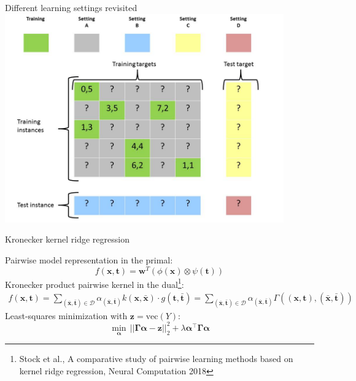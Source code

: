\documentclass[]{beamer}
\newcommand{\kkernelm}{\bm{\Gamma}}
\newcommand{\regparam}{\lambda}
\newcommand{\transpose}{^\intercal}
\newcommand{\bm}[1]{\mathbf{#1}}
\renewcommand{\vec}[1]{\boldsymbol{#1}}
\begin{document}
\begin{frame}{Different learning settings revisited}
   \center
	\vspace{0.4cm}
   \includegraphics[width=0.9\textwidth]{Figures/pictures/Slide16} %
\end{frame}

\begin{frame}{Kronecker kernel ridge regression}

\vspace{0.5cm}
Pairwise model representation in the primal: 
\begin{equation*}
\label{eq:pairwise}
f(\vec{x},\vec{t}) = \vec{w}^T \left(\phi(\vec{x}) \otimes \psi(\vec{t}) \right) 
\end{equation*}
Kronecker product pairwise kernel in the dual\footnote{Stock et al., A comparative study of pairwise learning methods based on kernel ridge regression, Neural Computation 2018}:
\begin{eqnarray*} 
f(\vec{x},\vec{t})= \sum_{(\bar{\vec{x}},\bar{\vec{t}}) \in \mathcal{D}} \alpha_{(\bar{\vec{x}},\bar{\vec{t}})}  k(\vec{x},\bar{\vec{x}}) \cdot g(\vec{t},\bar{\vec{t}})  = \sum_{(\bar{\vec{x}},\bar{\vec{t}}) \in \mathcal{D}} \alpha_{(\bar{\vec{x}},\bar{\vec{t}})} \Gamma((\vec{x},\vec{t}),(\bar{\vec{x}},\bar{\vec{t}})) 
\end{eqnarray*}
Least-squares minimization with 
$\bm{z} = \textrm{vec}{(Y)}$: 
$$ \min_{\bm{\boldsymbol\alpha}} \, ||\bm{\kkernelm}\bm{\boldsymbol\alpha} -\bm{z} ||^2_2 +\regparam\bm{\boldsymbol\alpha }\transpose\kkernelm\bm{\boldsymbol\alpha} $$


\end{frame}
\end{document}
